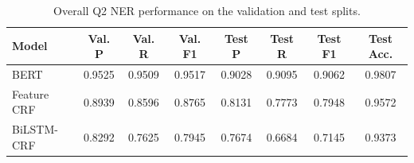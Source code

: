 \begin{table}[H]
\centering
\small
\begin{tabular}{lccccccc}
\toprule
Model & Val. P & Val. R & Val. F1 & Test P & Test R & Test F1 & Test Acc. \\
\midrule
BERT & 0.9525 & 0.9509 & 0.9517 & 0.9028 & 0.9095 & 0.9062 & 0.9807 \\
Feature CRF & 0.8939 & 0.8596 & 0.8765 & 0.8131 & 0.7773 & 0.7948 & 0.9572 \\
BiLSTM-CRF & 0.8292 & 0.7625 & 0.7945 & 0.7674 & 0.6684 & 0.7145 & 0.9373 \\
\bottomrule
\end{tabular}
\caption{Overall Q2 NER performance on the validation and test splits.}
\label{tab:q2_overall_results}
\end{table}